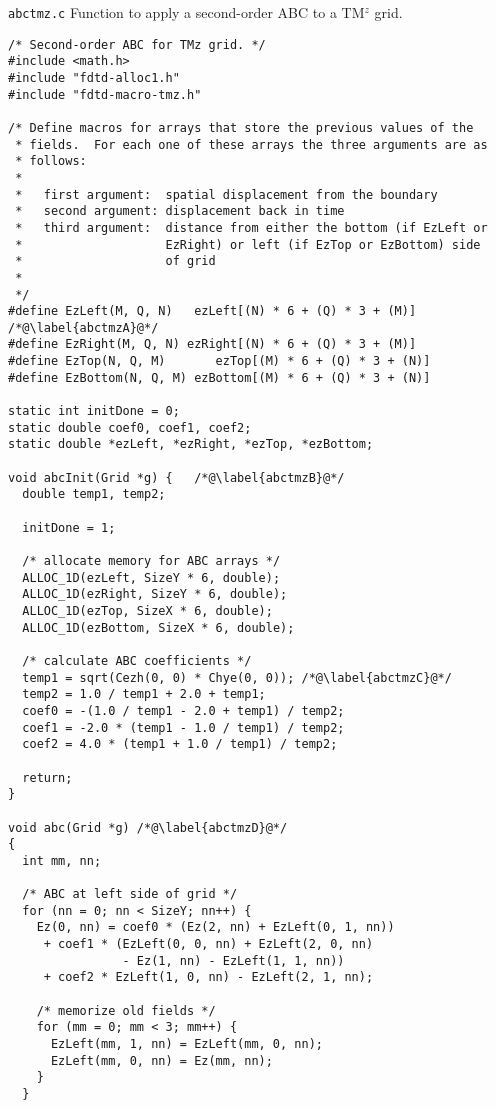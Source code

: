 \begin{program}
{\tt abctmz.c}  Function to apply a second-order ABC to a TM$^z$ grid.
\label{pro:abctmz}
\codemiddle
\begin{lstlisting}
/* Second-order ABC for TMz grid. */
#include <math.h>
#include "fdtd-alloc1.h"
#include "fdtd-macro-tmz.h"

/* Define macros for arrays that store the previous values of the
 * fields.  For each one of these arrays the three arguments are as
 * follows:
 *
 *   first argument:  spatial displacement from the boundary
 *   second argument: displacement back in time
 *   third argument:  distance from either the bottom (if EzLeft or
 *                    EzRight) or left (if EzTop or EzBottom) side
 *                    of grid
 *                    
 */
#define EzLeft(M, Q, N)   ezLeft[(N) * 6 + (Q) * 3 + (M)] /*@\label{abctmzA}@*/
#define EzRight(M, Q, N) ezRight[(N) * 6 + (Q) * 3 + (M)]
#define EzTop(N, Q, M)       ezTop[(M) * 6 + (Q) * 3 + (N)]
#define EzBottom(N, Q, M) ezBottom[(M) * 6 + (Q) * 3 + (N)]

static int initDone = 0;
static double coef0, coef1, coef2;
static double *ezLeft, *ezRight, *ezTop, *ezBottom;

void abcInit(Grid *g) {   /*@\label{abctmzB}@*/
  double temp1, temp2;
  
  initDone = 1;

  /* allocate memory for ABC arrays */
  ALLOC_1D(ezLeft, SizeY * 6, double);
  ALLOC_1D(ezRight, SizeY * 6, double);
  ALLOC_1D(ezTop, SizeX * 6, double);
  ALLOC_1D(ezBottom, SizeX * 6, double);

  /* calculate ABC coefficients */
  temp1 = sqrt(Cezh(0, 0) * Chye(0, 0)); /*@\label{abctmzC}@*/
  temp2 = 1.0 / temp1 + 2.0 + temp1;
  coef0 = -(1.0 / temp1 - 2.0 + temp1) / temp2;
  coef1 = -2.0 * (temp1 - 1.0 / temp1) / temp2;
  coef2 = 4.0 * (temp1 + 1.0 / temp1) / temp2;

  return;
} 

void abc(Grid *g) /*@\label{abctmzD}@*/
{
  int mm, nn;

  /* ABC at left side of grid */
  for (nn = 0; nn < SizeY; nn++) {
    Ez(0, nn) = coef0 * (Ez(2, nn) + EzLeft(0, 1, nn))
     + coef1 * (EzLeft(0, 0, nn) + EzLeft(2, 0, nn)
                - Ez(1, nn) - EzLeft(1, 1, nn))
     + coef2 * EzLeft(1, 0, nn) - EzLeft(2, 1, nn);

    /* memorize old fields */ 
    for (mm = 0; mm < 3; mm++) {
      EzLeft(mm, 1, nn) = EzLeft(mm, 0, nn);
      EzLeft(mm, 0, nn) = Ez(mm, nn);
    }
  }
  

\end{lstlisting}
\end{program}
